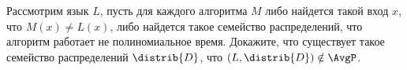 Рассмотрим язык $L$, пусть для каждого алгоритма $M$ либо найдется такой вход $x$, что $M(x) \neq L(x)$,
либо найдется такое семейство распределений, что алгоритм работает не полиномиальное время. Докажите, что
существует такое семейство распределений $\distrib{D}$, что $(L, \distrib{D}) \notin \AvgP$.